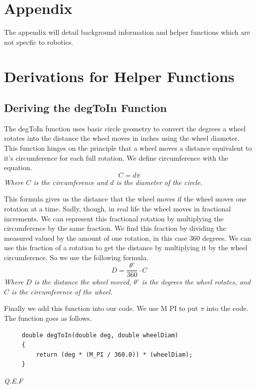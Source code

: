 \documentclass[12pt]{article}
\begin{document}
%
%
\newpage
\appendix
\section*{Appendix}
The appendix will detail background information and helper functions which are not specfic to robotics.
\section{Derivations for Helper Functions}
\subsection{Deriving the degToIn Function} \label{app_degToIn}
    The degToIn function uses basic circle geometry to convert the degrees a wheel rotates into the distance the wheel moves in inches using the wheel diameter. This function hinges on the principle that a wheel moves a distance equivalent to it's circumference for each full rotation. We define circumference with the equation.
    $$ C = d\pi $$
    \center\textit{Where $C$ is the circumference and $d$ is the diameter of the circle.}

    \raggedright
    This formula gives us the distance that the wheel moves if the wheel moves one rotation at a time. Sadly, though, in real life the wheel moves in fractional increments. We can represent this fractional rotation by multiplying the circumference by the same fraction. We find this fraction by dividing the measured valued by the amount of one rotation, in this case 360 degrees. We can use this fraction of a rotation to get the distance by multiplying it by the wheel circumference. So we use the following formula.
    $$ D = \frac{\theta^\circ}{360} \cdot C $$
    \center\textit{Where $D$ is the distance the wheel moved, $\theta^\circ$ is the degrees the wheel rotates, and $C$ is the circumference of the wheel.}

    \raggedright
    Finally we add this function into our code. We use M PI to put $\pi$ into the code. The function goes as follows.

    \begin{verbatim}
     double degToIn(double deg, double wheelDiam)
     {
         return (deg * (M_PI / 360.0)) * (wheelDiam);
     }
    \end{verbatim}

    \textit{Q.E.F}

    \pagebreak
\end{document}
